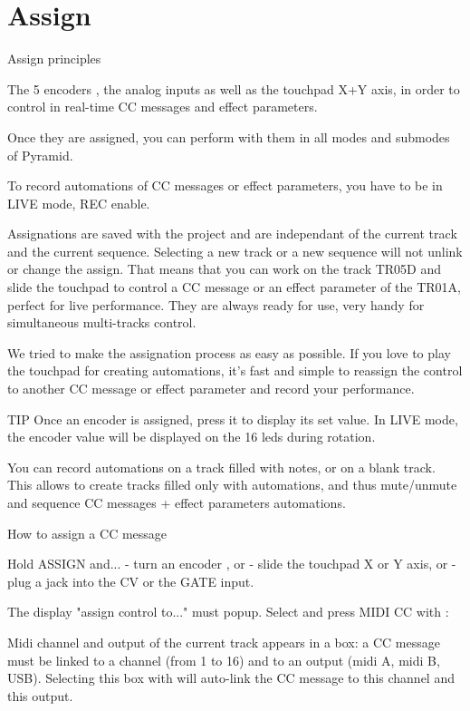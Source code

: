 \chapter{Assign}

Assign principles

The 5 encoders  , the analog inputs as well as the touchpad  X+Y axis, in order to control in real-time CC messages and effect parameters.

Once they are assigned, you can perform with them in all modes and submodes of Pyramid.

To record automations of CC messages or effect parameters, you have to be in LIVE mode, REC enable.

Assignations are saved with the project and are independant of the current track and the current sequence. Selecting a new track or a new sequence will not unlink or change the assign. That means that you can work on the track TR05D and slide the touchpad to control a CC message or an effect parameter of the TR01A, perfect for live performance. They are always ready for use, very handy for simultaneous multi-tracks control.

We tried to make the assignation process as easy as possible. If you love to play the touchpad for creating automations, it's fast and simple to reassign the control to another CC message or effect parameter and record your performance.

 TIP  Once an encoder is assigned, press it to display its set value. In LIVE mode, the encoder value will be displayed on the 16 leds during rotation.

You can record automations on a track filled with notes, or on a blank track. This allows to create tracks filled only with automations, and thus mute/unmute and sequence CC messages + effect parameters automations.

How to assign a CC message

Hold ASSIGN and...
- turn an encoder  , or
- slide the touchpad  X or Y axis, or
- plug a jack into the CV or the GATE input.

The display "assign control to..." must popup. Select and press MIDI CC with : 

 

Midi channel and output of the current track appears in a box: a CC message must be linked to a channel (from 1 to 16) and to an output (midi A, midi B, USB). Selecting this box with  will auto-link the CC message to this channel and this output. 

